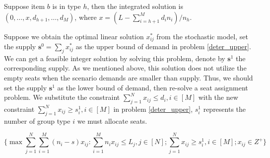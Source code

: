 \begin{lem}
Suppose item $b$ is in type $h$, then the integrated solution is $(0,\ldots, x,d_{h+1}, \ldots, d_{M})$, where $x = (L- \sum_{i = h+1}^{M} {d_i n_i})/ n_h$.  
\end{lem}


  


Suppose we obtain the optimal linear solution $x^{*}_{ij}$ from the stochastic model, set the supply $\mathbf{s}^{0} = \sum_{j} x^{*}_{ij}$ as the upper bound of demand in problem \eqref{deter_upper}. We can get a feasible integer solution by solving this problem, denote by $\mathbf{s}^{1}$ the corresponding supply. As we mentioned above, this solution does not utilize the empty seats when the scenario demands are smaller than supply. Thus, we should set the supply $\mathbf{s}^{1}$ as the lower bound of demand, then re-solve a seat assignment problem. We substitute the constraint $\sum_{j =1}^{N} x_{ij} \leq d_{i}, i \in [M]$ with the new constraint $\sum_{j =1}^{N} x_{ij} \geq s_{i}^{1}, i \in [M]$ in problem \eqref{deter_upper}, $s_{i}^{1}$ represents the number of group type $i$ we must allocate seats.

\begin{equation}\label{deter_lower}
\{\max \sum_{j=1}^{N} \sum_{i=1}^{M}(n_i -s)x_{ij}: \sum_{i = 1}^{M} n_i x_{ij} \leq L_{j}, j \in [N]; \sum_{j =1}^{N} x_{ij} \geq s_{i}^{1}, i \in [M]; x_{ij} \in Z^{+} \}
\end{equation}


